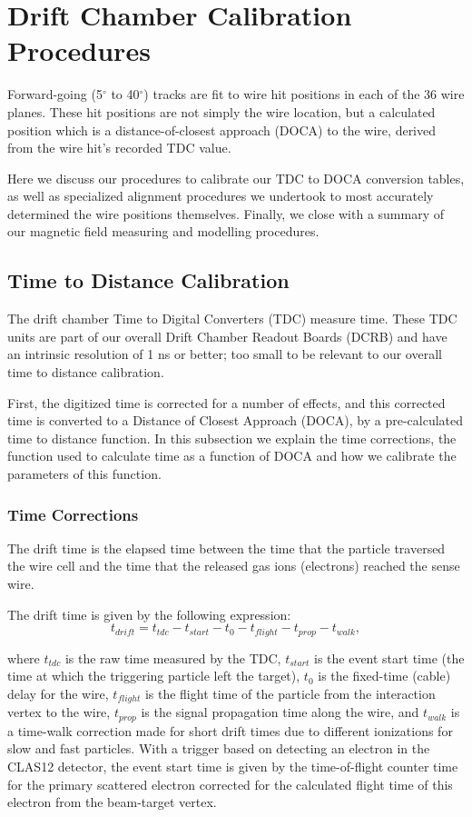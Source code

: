 \section{Drift Chamber Calibration Procedures}
Forward-going (5$^{\circ}$ to 40$^{\circ}$) tracks are fit to
wire hit positions in each of the 36 wire planes.  These
hit positions are not simply the wire location, but 
a calculated position which is a distance-of-closest approach (DOCA)
to the wire, derived from the wire hit's recorded TDC value.  

Here we discuss our procedures to calibrate our TDC to DOCA conversion
tables, as well as specialized alignment procedures we undertook
to most accurately determined the wire positions themselves.
Finally, we close with a summary of our magnetic field measuring
and modelling procedures.

\subsection{Time to Distance Calibration}
The drift chamber Time to Digital Converters (TDC) measure time.  
These TDC units are part of our overall Drift Chamber Readout Boards (DCRB) and
have an intrinsic resolution of 1 ns or better; too small to be relevant to
our overall time to distance calibration.

First, the digitized time is corrected for a number
of effects, and this corrected time is converted to a Distance of Closest Approach (DOCA), by 
a pre-calculated time to distance function.  In this subsection we 
explain the time corrections, the function used to calculate time as a 
function of DOCA and how we calibrate the parameters of this function.

\subsubsection{Time Corrections}
The drift time is the elapsed time between the time that the particle 
traversed the wire cell and the time that the released gas ions (electrons)
reached the sense wire.

The drift time is given by the following expression:
\begin{equation} 
\label{tdrift}
t_{drift} = t_{tdc} - t_{start} - t_{0} - t_{flight} - t_{prop} - t_{walk},
\end{equation}

\noindent
where $t_{tdc}$ is the raw time measured by the TDC, $t_{start}$ is the event start time (the time at which the triggering particle left the target), 
$t_0$ is the fixed-time (cable) delay for the wire, $t_{flight}$ is the 
flight time of the particle from the interaction vertex to the wire, $t_{prop}$ 
is the signal propagation time along the wire, and $t_{walk}$ is a time-walk 
correction made for short drift times due to different ionizations for slow 
and fast particles.  
With a trigger based on detecting an electron in the CLAS12 detector, the event start time is 
given by the time-of-flight counter time for the primary scattered electron 
corrected for the calculated flight time of this electron from the beam-target vertex.

